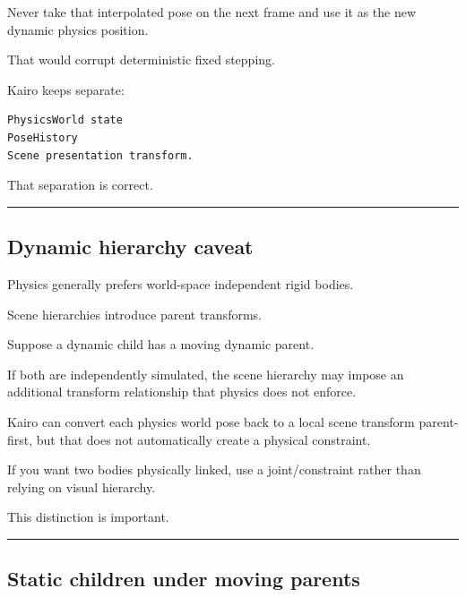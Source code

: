 Never take that interpolated pose on the next frame and use it as the new dynamic physics position.

That would corrupt deterministic fixed stepping.

Kairo keeps separate:

\begin{verbatim}
PhysicsWorld state
PoseHistory
Scene presentation transform.
\end{verbatim}

That separation is correct.

\begin{center}\rule{0.5\linewidth}{0.5pt}\end{center}

\subsection{Dynamic hierarchy caveat}\label{06-engine-ii-ch038-dynamic-hierarchy-caveat}

\hypertarget{06-engine-ii-ch038-dynamic-hierarchy-caveat}{}

Physics generally prefers world-space independent rigid bodies.

Scene hierarchies introduce parent transforms.

Suppose a dynamic child has a moving dynamic parent.

If both are independently simulated, the scene hierarchy may impose an additional transform relationship that physics does not enforce.

Kairo can convert each physics world pose back to a local scene transform parent-first, but that does not automatically create a physical constraint.

If you want two bodies physically linked, use a joint/constraint rather than relying on visual hierarchy.

This distinction is important.

\begin{center}\rule{0.5\linewidth}{0.5pt}\end{center}

\subsection{Static children under moving parents}\label{06-engine-ii-ch038-static-children-under-moving-parents}

\hypertarget{06-engine-ii-ch038-static-children-under-moving-parents}{}


